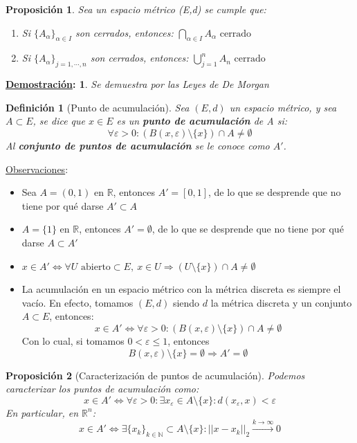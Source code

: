\documentclass[10pt,a4paper,openright]{book}
\theoremstyle{break}
\newtheorem*{defi}{Definición}
\newtheorem*{prop}{Proposición}
\newtheorem*{demo}{\underline{Demostración}:}
\begin{document}
\begin{prop}
Sea un espacio métrico (E,d) se cumple que:
\begin{enumerate}
\item Si $\{A_\alpha\}_{\alpha \in I}$ son cerrados, entonces: $\bigcap_{\alpha \in I} A_{\alpha} \mbox{ cerrado}$
\item Si $\{A_\alpha\}_{j = 1, \cdots, n}$ son cerrados, entonces: $\bigcup_{j = 1}^{n} A_{n} \mbox{ cerrado}$
\end{enumerate}
\end{prop}
\begin{demo}
Se demuestra por las Leyes de De Morgan
\end{demo}

\begin{defi}[Punto de acumulación]
Sea $(E,d)$ un espacio métrico, y sea $A \subset E$, se dice que $x \in E$ es un \textbf{punto de acumulación} de A si:
$$\forall \varepsilon > 0: \left(B(x,\varepsilon)\setminus\{x\}\right)\cap A \neq \emptyset$$
 Al \textbf{conjunto de puntos de acumulación} se le conoce como $A'$.
\end{defi}

\underline{Observaciones}:
\begin{itemize}
\item Sea $A=(0,1)$ en $\mathbb{R}$, entonces $A'=[0,1]$, de lo que se desprende que no tiene por qué darse $A'\subset A$
\item $A = \{1\}$ en $\mathbb{R}$, entonces $A' = \emptyset$, de lo que se desprende que no tiene por qué darse $A\subset A'$
\item $x\in A' \Leftrightarrow \forall U \mbox{ abierto} \subset E, \ x\in U \Rightarrow \left( U\setminus\{x\}\right) \cap A \neq \emptyset$
\item La acumulación en un espacio métrico con la métrica discreta es siempre el vacío. En efecto, tomamos $(E,d)$ siendo $d$ la métrica discreta y un conjunto $A\subset E$, entonces:
$$x\in A' \Leftrightarrow \forall \varepsilon > 0: \left( B(x,\varepsilon) \setminus\{x\}\right) \cap A \neq \emptyset$$
Con lo cual, si tomamos $0 < \varepsilon \leq 1$, entonces
$$B(x,\varepsilon)\setminus\{x\} =\emptyset \Rightarrow A' = \emptyset$$
\end{itemize}

\begin{prop}[Caracterización de puntos de acumulación]
Podemos caracterizar los puntos de acumulación como:
$$x\in A' \Leftrightarrow \forall \varepsilon > 0: \exists x_{\varepsilon} \in A\setminus\{x\}: d(x_\varepsilon, x)< \varepsilon$$
En particular, en $\mathbb{R}^{n}$:
$$x\in A' \Leftrightarrow \exists \{x_k\}_{k\in \mathbb N}\subset A\setminus\{x\}: ||x-x_k||_{2}\xrightarrow{k\rightarrow\infty} 0$$
\end{prop}
\end{document}
